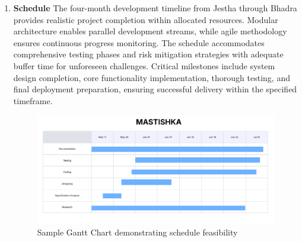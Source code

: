 \begin{enumerate}[label=\roman*.]
    \item \textbf{Schedule}
          The four-month development timeline from Jestha through Bhadra provides realistic project completion within allocated resources. Modular architecture enables parallel development streams, while agile methodology ensures continuous progress monitoring. The schedule accommodates comprehensive testing phases and risk mitigation strategies with adequate buffer time for unforeseen challenges. Critical milestones include system design completion, core functionality implementation, thorough testing, and final deployment preparation, ensuring successful delivery within the specified timeframe.
          \begin{figure}[H]
              \centering
              \includegraphics[width=1\linewidth]{Images/gantt.png}
              \caption{Sample Gantt Chart demonstrating schedule feasibility}
              \label{fig:gantt}
          \end{figure}
\end{enumerate}

